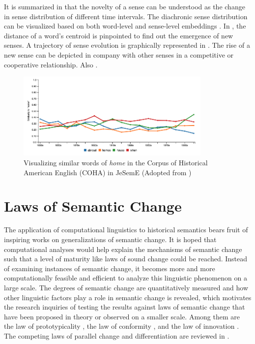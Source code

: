 It is summarized in \textcite{tang2018state} that the novelty of a sense can be understood as the change in sense distribution of different time intervals. The diachronic sense distribution can be visualized based on both word-level and sense-level embeddings \parencite{dubossarsky2015bottom,hu2019diachronic}. In \textcite{dubossarsky2015bottom}, the distance of a word's centroid is pinpointed to find out the emergence of new senses. A trajectory of sense evolution is graphically represented in \textcite{hu2019diachronic}. The rise of a new sense can be depicted in company with other senses in a competitive or cooperative relationship. Also \parencite{gonen2020simple}.

\begin{figure}[H]
  \centering
  \includegraphics[width=0.85\textwidth,keepaspectratio]{figures_ref/jeseme_similar_words}
  \caption{Visualizing similar words of \textit{home} in the Corpus of Historical American English (COHA) in JeSemE (Adopted from \textcite{hellrich2017exploring})} \label{fig:jeseme_similar_words}
\end{figure}

\section{Laws of Semantic Change}
The application of computational linguistics to historical semantics bears fruit of inspiring works on generalizations of semantic change. It is hoped that computational analyses would help explain the mechanisms of semantic change such that a level of maturity like laws of sound change could be reached. Instead of examining instances of semantic change, it becomes more and more computationally feasible and efficient to analyze this linguistic phenomenon on a large scale. The degrees of semantic change are quantitatively measured and how other linguistic factors play a role in semantic change is revealed, which motivates the research inquiries of testing the results against laws of semantic change that have been proposed in theory or observed on a smaller scale. Among them are the law of prototypicality \parencite{dubossarsky2015bottom}, the law of conformity \parencite{hamilton2016law}, and the law of innovation \parencite{hamilton2016law}. The competing laws of parallel change and differentiation are reviewed in \textcite{xu2015computational}.

